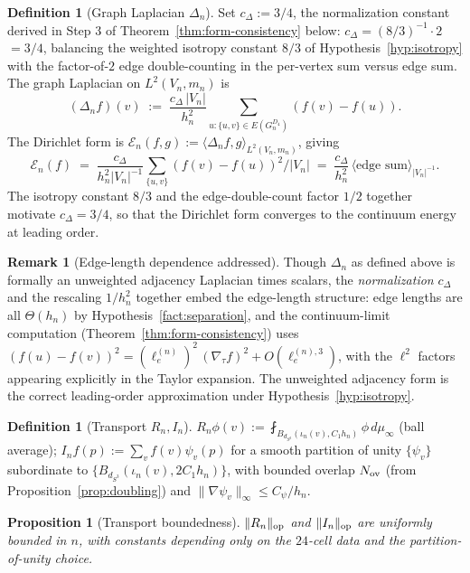 \documentclass[11pt, a4paper]{amsart}
\newtheorem{proposition}[theorem]{Proposition}
\theoremstyle{definition}
\newtheorem{definition}[theorem]{Definition}
\newtheorem{remark}[theorem]{Remark}
\newcommand{\dsph}{d_{S^3}}
\begin{document}
\begin{definition}[Graph Laplacian $\Delta_n$]
\label{def:Delta-n}
Set $c_\Delta := 3/4$, the normalization constant derived in
Step 3 of Theorem~\ref{thm:form-consistency} below: $c_\Delta =
(8/3)^{-1} \cdot 2$ $= 3/4$, balancing the weighted isotropy
constant $8/3$ of Hypothesis~\ref{hyp:isotropy} with the
factor-of-$2$ edge double-counting in the per-vertex sum versus
edge sum. The graph Laplacian on $L^2(V_n, m_n)$
is
\[
  (\Delta_n f)(v)
    \;:=\; \frac{c_\Delta\,|V_n|}{h_n^2}
    \sum_{u : \{u, v\} \in E(G_n^{D_4})} (f(v) - f(u)).
\]
The Dirichlet form is $\mathcal E_n(f, g) := \langle \Delta_n f,
g \rangle_{L^2(V_n, m_n)}$, giving
\[
  \mathcal E_n(f) \;=\; \frac{c_\Delta}{h_n^2 |V_n|^{-1}}
    \sum_{\{u, v\}} (f(v) - f(u))^2 / |V_n|
    \;=\; \frac{c_\Delta}{h_n^2}\,\langle \text{edge sum}
    \rangle_{|V_n|^{-1}}.
\]
The isotropy constant $8/3$ and the edge-double-count factor
$1/2$ together motivate $c_\Delta = 3/4$, so that the Dirichlet
form converges to the continuum energy at leading order.
\end{definition}

\begin{remark}[Edge-length dependence addressed]
\label{rmk:edge-length}
Though $\Delta_n$ as defined above is formally an unweighted
adjacency Laplacian times scalars, the \emph{normalization}
$c_\Delta$ and the rescaling $1/h_n^2$ together embed the
edge-length structure: edge lengths are all $\Theta(h_n)$ by
Hypothesis~\ref{fact:separation}, and the continuum-limit computation
(Theorem~\ref{thm:form-consistency}) uses $(f(u) - f(v))^2 =
(\ell_e^{(n)})^2\,(\nabla_\tau f)^2 + O(\ell_e^{(n), 3})$, with
the $\ell^2$ factors appearing explicitly in the Taylor expansion.
The unweighted adjacency form is the correct leading-order
approximation under Hypothesis~\ref{hyp:isotropy}.
\end{remark}

\begin{definition}[Transport $R_n, I_n$]
\label{def:transport}
$R_n \phi(v) := \fint_{B_{\dsph}(\iota_n(v), C_1 h_n)}
\phi \, d\mu_\infty$ (ball average);
$I_n f(p) := \sum_v f(v) \psi_v(p)$ for a smooth partition of
unity $\{\psi_v\}$ subordinate to $\{B_{\dsph}(\iota_n(v), 2
C_1 h_n)\}$, with bounded overlap $N_{\rm ov}$ (from
Proposition~\ref{prop:doubling}) and $\|\nabla
\psi_v\|_\infty \leq C_\psi / h_n$.
\end{definition}

\begin{proposition}[Transport boundedness]
\label{prop:transport-bounded}
$\|R_n\|_{\rm op}$ and $\|I_n\|_{\rm op}$ are uniformly bounded
in $n$, with constants depending only on the $24$-cell data and
the partition-of-unity choice.
\end{proposition}
\end{document}

